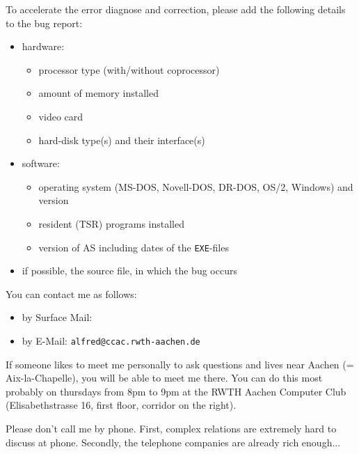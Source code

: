 \documentclass[12pt,twoside]{report}
\newcommand{\tty}[1]{{\tt #1}}
\begin{document}
To accelerate the error diagnose and correction, please add the
following details to the bug report:
\begin{itemize}
\item{hardware: \begin{itemize}
                \item{processor type (with/without coprocessor)}
                \item{amount of memory installed}
                \item{video card}
                \item{hard-disk type(s) and their interface(s)}
                \end{itemize}}
\item{software: \begin{itemize}
                \item{operating system (MS-DOS, Novell-DOS, DR-DOS, OS/2,
                      Windows) and version}
                \item{resident (TSR) programs installed}
                \item{version of AS including dates of the \tty{EXE}-files}
                \end{itemize}}
\item{if possible, the source file, in which the bug occurs}
\end{itemize}
You can contact me as follows:
\begin{itemize}
\item{by Surface Mail: }
\item{by E-Mail: \tty{alfred@ccac.rwth-aachen.de}}
\end{itemize}
If someone likes to meet me personally to ask questions and lives
near Aachen (= Aix-la-Chapelle), you will be able to meet me there.
You can do this most probably on thursdays from 8pm to 9pm at the
RWTH Aachen Computer Club (Elisabethstrasse 16, first floor, corridor
on the right).

Please don't call me by phone.  First, complex relations are
extremely hard to discuss at phone.  Secondly, the telephone
companies are already rich enough...
\end{document}
